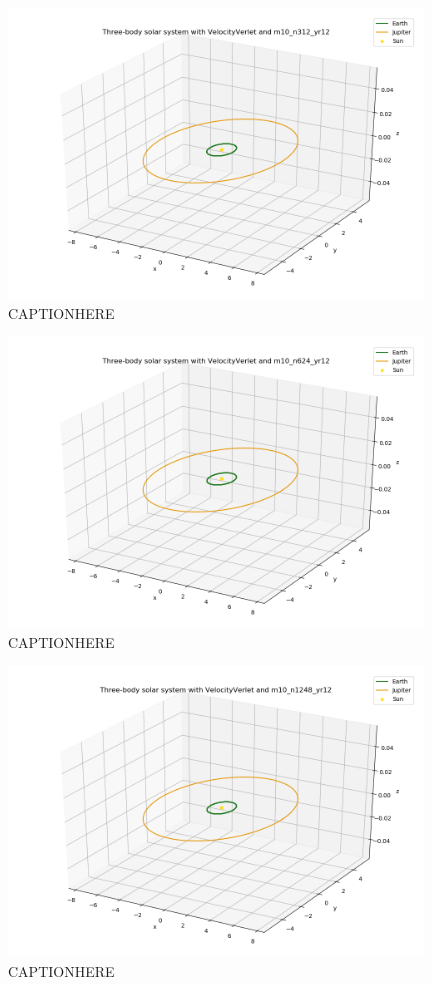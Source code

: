 \documentclass{article}
\begin{document}
    \begin{figure}[H]
        \centering
        \includegraphics[width = 11cm]{img/plot3D_S_E_J_V_m10_n312_yr12.png}
        \caption{CAPTIONHERE}
        \label{fig:plot3D_S_E_J_V_m10_n312_yr12}
    \end{figure}

    \begin{figure}[H]
        \centering
        \includegraphics[width = 11cm]{img/plot3D_S_E_J_V_m10_n624_yr12.png}
        \caption{CAPTIONHERE}
        \label{fig:plot3D_S_E_J_V_m10_n624_yr12}
    \end{figure}

    \begin{figure}[H]
        \centering
        \includegraphics[width = 11cm]{img/plot3D_S_E_J_V_m10_n1248_yr12.png}
        \caption{CAPTIONHERE}
        \label{fig:plot3D_S_E_J_V_m10_n1248_yr12}
    \end{figure}
\end{document}
